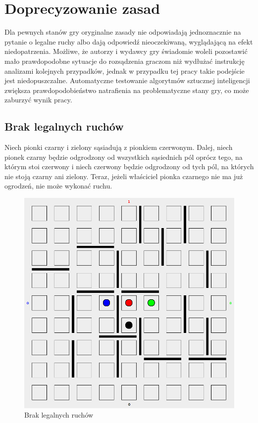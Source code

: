 \documentclass{pracamgr}
\begin{document}
\section{Doprecyzowanie zasad}

Dla pewnych stanów gry oryginalne zasady nie odpowiadają jednoznacznie na pytanie o legalne ruchy albo dają odpowiedź nieoczekiwaną, wyglądającą na efekt niedopatrzenia. Możliwe, że autorzy i wydawcy gry świadomie woleli pozostawić mało prawdopodobne sytuacje do rozsądzenia graczom niż wydłużać instrukcję analizami kolejnych przypadków, jednak w przypadku tej pracy takie podejście jest niedopuszczalne. Automatyczne testowanie algorytmów sztucznej inteligencji zwiększa prawdopodobieństwo natrafienia na problematyczne stany gry, co może zaburzyć wynik pracy.

\subsection*{Brak legalnych ruchów}

Niech pionki czarny i zielony sąsiadują z pionkiem czerwonym. Dalej, niech pionek czarny będzie odgrodzony od wszystkich sąsiednich pól oprócz tego, na którym stoi czerwony i niech czerwony będzie odgrodzony od tych pól, na których nie stoją czarny ani zielony. Teraz, jeżeli właściciel pionka czarnego nie ma już ogrodzeń, nie może wykonać ruchu.

\begin{figure}[ht!]
\centering
\includegraphics[width=120mm]{img/no-move.png}
\caption{Brak legalnych ruchów \label{overflow}}
\end{figure}
\end{document}
